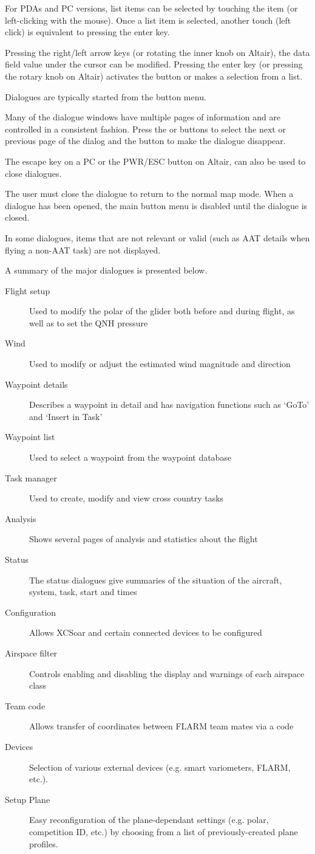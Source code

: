 For PDAs and PC versions, list items can be selected by touching the item (or
left-clicking with the mouse). Once a list item is selected, another touch
(left click) is equivalent to pressing the enter key.

Pressing the right/left arrow keys (or rotating the inner knob on Altair), the
data field value under the cursor can be modified. Pressing the enter key (or
pressing the rotary knob on Altair) activates the button or makes a selection
from a list.

Dialogues are typically started from the button menu.  

Many of the dialogue windows have multiple pages of information and are controlled
in a consistent fashion. Press the \button{$<$} or \button{$>$} buttons to
select the next or previous page of the dialog and the  button to
make the dialogue disappear.

The escape key on a PC or the PWR/ESC button on Altair, can also be used to
close dialogues.

The user must close the dialogue to return to the normal map mode. When a dialogue
has been opened, the main button menu is disabled until the dialogue is closed.

In some dialogues, items that are not relevant or valid (such as AAT details when
flying a non-AAT task) are not displayed.

A summary of the major dialogues is presented below.
\begin{description}
\item[Flight setup] Used to modify the polar of the glider both before and
during flight, as well as to set the QNH pressure
\item[Wind] Used to modify or adjust the estimated wind magnitude and direction
\item[Waypoint details] Describes a waypoint in detail and has navigation
functions such as `GoTo' and `Insert in Task'
\item[Waypoint list] Used to select a waypoint from the waypoint database
\item[Task manager] Used to create, modify and view cross country tasks
\item[Analysis] Shows several pages of analysis and statistics about the flight
\item[Status] The status dialogues give summaries of the situation of the 
aircraft, system, task, start and times
\item[Configuration] Allows XCSoar and certain connected devices to be
configured
\item[Airspace filter] Controls enabling and disabling the display and warnings
of each airspace class
\item[Team code] Allows transfer of coordinates between FLARM team mates via a 
  code
\item[Devices]  Selection of various external devices (e.g. smart variometers, 
  FLARM, etc.).
\item[Setup Plane]  Easy reconfiguration of the plane-dependant settings (e.g. 
  polar, competition ID, etc.) by choosing from a list of previously-created 
  plane profiles.
\end{description}

